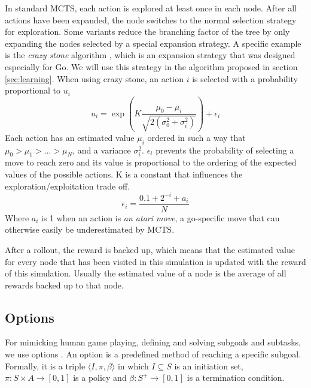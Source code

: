 In standard MCTS, each action is explored at least once in each node. After all
actions have been expanded, the node switches to the normal selection strategy
for exploration. Some variants reduce the branching factor of the tree by only
expanding the nodes selected by a special expansion strategy. A specific example
is the \emph{crazy stone} algorithm \cite{coulom2007efficient}, which is an
expansion strategy that was designed especially for Go. We will use this
strategy in the algorithm proposed in section \ref{sec:learning}.
When using crazy stone, an action $i$ is selected with a probability
proportional to $u_i$
\begin{equation}
	\label{eq:crazystone}
	u_i = \exp\left(K \frac{\mu_0 - \mu_i}{\sqrt{2\left(\sigma_0^2 +
\sigma_i^2\right)}}\right) + \epsilon_i
\end{equation}
Each action has an estimated value $\mu_i$ ordered in such a way that $\mu_0 >
\mu_1 > ... > \mu_N$, and a variance $\sigma_i^2$. $\epsilon_i$ prevents 
the probability of selecting a move to reach zero and its value is proportional to
the ordering of the expected values of the possible actions. K is a constant
that influences the exploration/exploitation trade off.
\begin{equation}
	\label{eq:epsilon}
	\epsilon_i = \frac{0.1 + 2^{-i} + a_i}{N}
\end{equation}
Where $a_i$ is 1 when an action is \emph{an atari move}, a go-specific
move that can otherwise easily be underestimated by MCTS.

After a rollout, the reward is backed up, which means that the estimated value
for every node that has been visited in this simulation is updated with the
reward of this simulation. Usually the estimated value of a node is the average
of all rewards backed up to that node.

\subsection{Options}
\label{subsec:options}
For mimicking human game playing, defining and solving subgoals and subtasks, we
use options \cite{sutton1999between, barto2003recent}. An option is a predefined method of
reaching a specific subgoal. Formally, it is a triple $\langle I, \pi,
\beta\rangle$ in which $I \subseteq S$ is an initiation set, $\pi: S \times A
\rightarrow [0, 1]$ is a policy and $\beta: S^+ \rightarrow[0,1]$ is a
termination condition.

